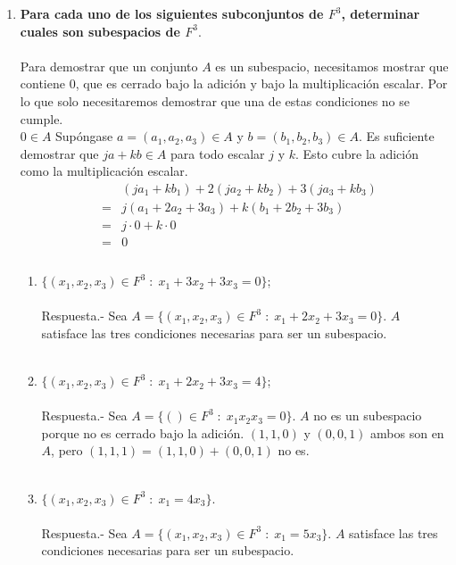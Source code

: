 \begin{multicols}{2}
\begin{enumerate}
    \item \textbf{\boldmath Para cada uno de los siguientes subconjuntos de $F^3$, determinar cuales son subespacios de $F^3$}.\\\\
	Para demostrar que un conjunto $A$ es un subespacio, necesitamos mostrar que contiene $0$, que es cerrado bajo la adición y bajo la multiplicación escalar. Por lo que solo necesitaremos demostrar que una de estas condiciones no se cumple.\\
	$0\in A$
		Supóngase $a=(a_1,a_2,a_3)\in A$ y $b=(b_1,b_2,b_3)\in A$. Es suficiente demostrar que $ja+kb \in A$ para todo escalar $j$ y $k.$ Esto cubre la adición como la multiplicación escalar.
		$$\begin{array}{rcl}
		    &&(ja_1+kb_1)+2(ja_2+kb_2)+3(ja_3+kb_3)\\
		    &=&j(a_1+2a_2+3a_3)+k(b_1+2b_2+3b_3)\\
		    &=&j\cdot 0 + k\cdot 0\\
		    &=&0\\\\
		\end{array}$$

	\begin{enumerate}[\bfseries a)]
	    \item $\lbrace (x_1,x_2,x_3) \in F^3\; : \; x_1+3x_2 + 3x_3=0 \rbrace$;\\\\
		Respuesta.-\; Sea $A=\lbrace (x_1,x_2,x_3) \in F^3\; : \; x_1+2x_2+3x_3=0\rbrace$. $A$ satisface las tres condiciones necesarias para ser un subespacio.\\\\

	    \item $\lbrace (x_1,x_2,x_3) \in F^3\; : \; x_1+2x_2 + 3x_3=4 \rbrace$;\\\\
		Respuesta.-\; Sea $A=\lbrace ()\in F^3\; : \; x_1x_2x_3=0\rbrace$. $A$ no es un subespacio porque no es cerrado bajo la adición. $(1,1,0)$ y $(0,0,1)$ ambos son en $A$, pero $(1,1,1)=(1,1,0)+(0,0,1)$ no es.\\\\

	    \item $\lbrace (x_1,x_2,x_3) \in F^3\; : \; x_1=4x_3 \rbrace$.\\\\
		Respuesta.-\; Sea $A=\lbrace (x_1,x_2,x_3)\in F^3\; : \; x_1=5x_3\rbrace$. $A$ satisface las tres condiciones necesarias para ser un subespacio.\\\\


\end{enumerate}
\end{enumerate}
\end{multicols}
